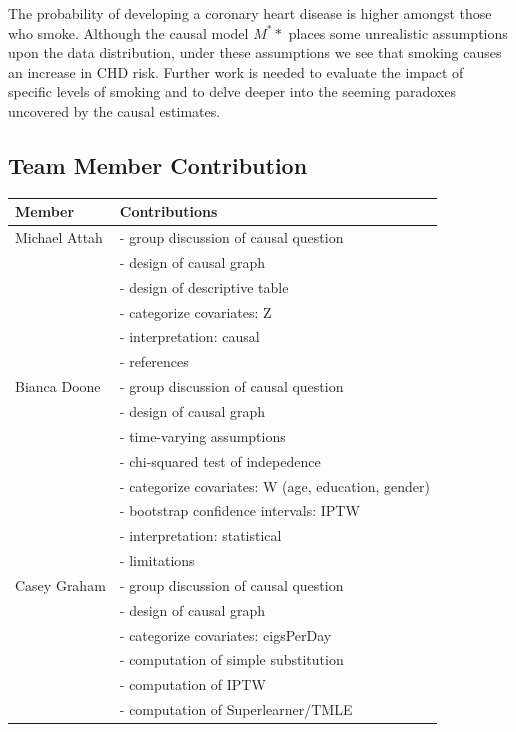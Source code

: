 \documentclass[]{article}
\begin{document}
The probability of developing a coronary heart disease is higher amongst
those who smoke. Although the causal model \(M^**\) places some
unrealistic assumptions upon the data distribution, under these
assumptions we see that smoking causes an increase in CHD risk. Further
work is needed to evaluate the impact of specific levels of smoking and
to delve deeper into the seeming paradoxes uncovered by the causal
estimates.

\newpage

\subsection{Team Member Contribution}\label{team-member-contribution}

\begin{table}[h!]
  \begin{tabular}{|l|l|}
  \hline
    Member & Contributions \\ \hline
    Michael Attah & - group discussion of causal question \\
      & - design of causal graph \\
      & - design of descriptive table \\
      & - categorize covariates: Z\\
      & - interpretation: causal\\ 
      & - references \\ \hline
    Bianca Doone & - group discussion of causal question \\
      & - design of causal graph \\
      & - time-varying assumptions \\
      & - chi-squared test of indepedence\\
      & - categorize covariates: W (age, education, gender) \\
      & - bootstrap confidence intervals: IPTW \\
      & - interpretation: statistical \\
      & - limitations \\ \hline
    Casey Graham & - group discussion of causal question \\
      & - design of causal graph \\
      & - categorize covariates: cigsPerDay \\
      & - computation of simple substitution \\
      & - computation of IPTW \\
      & - computation of Superlearner/TMLE \\ 

\end{tabular}
\end{table}
\end{document}
